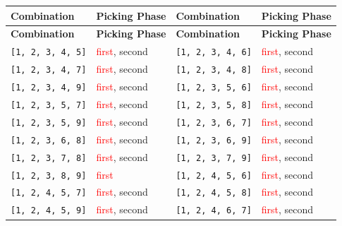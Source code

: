\normalsize

\small
\begin{longtable}{|p{3.5cm}|p{2.5cm}||p{3.5cm}|p{2.5cm}|}
\hline
\rowcolor{black!20}
\textbf{Combination} & \textbf{Picking Phase} & \textbf{Combination} & \textbf{Picking Phase} \\ \hline
\endfirsthead

\hline
\rowcolor{black!20}
\textbf{Combination} & \textbf{Picking Phase} & \textbf{Combination} & \textbf{Picking Phase} \\ \hline
\endhead

\texttt{[1, 2, 3, 4, 5]} & \textcolor{red}{first}, \textcolor{CustomBlue}{second} & \texttt{[1, 2, 3, 4, 6]} & \textcolor{red}{first}, \textcolor{CustomBlue}{second} \\ \hline
\texttt{[1, 2, 3, 4, 7]} & \textcolor{red}{first}, \textcolor{CustomBlue}{second} & \texttt{[1, 2, 3, 4, 8]} & \textcolor{red}{first}, \textcolor{CustomBlue}{second} \\ \hline
\texttt{[1, 2, 3, 4, 9]} & \textcolor{red}{first}, \textcolor{CustomBlue}{second} & \texttt{[1, 2, 3, 5, 6]} & \textcolor{red}{first}, \textcolor{CustomBlue}{second} \\ \hline
\texttt{[1, 2, 3, 5, 7]} & \textcolor{red}{first}, \textcolor{CustomBlue}{second} & \texttt{[1, 2, 3, 5, 8]} & \textcolor{red}{first}, \textcolor{CustomBlue}{second} \\ \hline
\texttt{[1, 2, 3, 5, 9]} & \textcolor{red}{first}, \textcolor{CustomBlue}{second} & \texttt{[1, 2, 3, 6, 7]} & \textcolor{red}{first}, \textcolor{CustomBlue}{second} \\ \hline
\texttt{[1, 2, 3, 6, 8]} & \textcolor{red}{first}, \textcolor{CustomBlue}{second} & \texttt{[1, 2, 3, 6, 9]} & \textcolor{red}{first}, \textcolor{CustomBlue}{second} \\ \hline
\texttt{[1, 2, 3, 7, 8]} & \textcolor{red}{first}, \textcolor{CustomBlue}{second} & \texttt{[1, 2, 3, 7, 9]} & \textcolor{red}{first}, \textcolor{CustomBlue}{second} \\ \hline
\texttt{[1, 2, 3, 8, 9]} & \textcolor{red}{first} & \texttt{[1, 2, 4, 5, 6]} & \textcolor{red}{first}, \textcolor{CustomBlue}{second} \\ \hline
\texttt{[1, 2, 4, 5, 7]} & \textcolor{red}{first}, \textcolor{CustomBlue}{second} & \texttt{[1, 2, 4, 5, 8]} & \textcolor{red}{first}, \textcolor{CustomBlue}{second} \\ \hline
\texttt{[1, 2, 4, 5, 9]} & \textcolor{red}{first}, \textcolor{CustomBlue}{second} & \texttt{[1, 2, 4, 6, 7]} & \textcolor{red}{first}, \textcolor{CustomBlue}{second} \\ \hline

\end{longtable}
